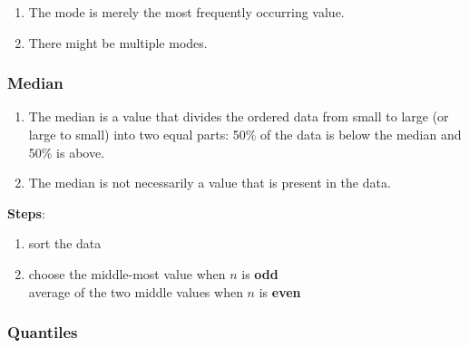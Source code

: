 \begin{enumerate}
    \item The mode is merely the most frequently occurring value. \cite{statistics/book/Statistics-for-Data-Scientists/Maurits-Kaptein}

    \item There might be multiple modes. \cite{statistics/book/Statistics-for-Data-Scientists/Maurits-Kaptein}
    
\end{enumerate}



\subsubsection{Median \cite{statistics/book/Statistics-for-Data-Scientists/Maurits-Kaptein}} \label{Data/Describing Data/Central Tendency/Median}

\begin{enumerate}
    \item The median is a value that divides the ordered data from small to large (or large to small) into two equal parts: 50\% of the data is below the median and 50\% is above. \cite{statistics/book/Statistics-for-Data-Scientists/Maurits-Kaptein}

    \item The median is not necessarily a value that is present in the data. \cite{statistics/book/Statistics-for-Data-Scientists/Maurits-Kaptein}
\end{enumerate}


\vspace{0.3cm}
\textbf{Steps}:
\begin{enumerate}
    \item sort the data

    \item choose the middle-most value when $n$ is \textbf{odd}\\
        average of the two middle values when $n$ is \textbf{even}
\end{enumerate}



\subsubsection{Quantiles \cite{statistics/book/Statistics-for-Data-Scientists/Maurits-Kaptein}} \label{Data/Describing Data/Central Tendency/Quantiles}

